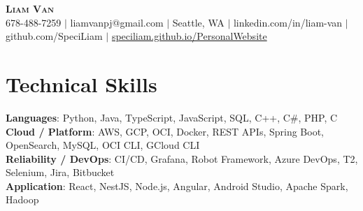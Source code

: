 \documentclass[letterpaper,11pt]{article}
\begin{document}

%
\begin{center}
    \textbf{\Huge \scshape Liam Van} \\ \vspace{1pt}
    \small 678-488-7259 $|$ \small {liamvanpj@gmail.com} $|$ Seattle, WA
 {{$|$ linkedin.com/in/liam-van} {$|$ github.com/SpeciLiam} {$|$ \href{https://speciliam.github.io/PersonalWebsite}{speciliam.github.io/PersonalWebsite}}}

\end{center}

\section{Technical Skills}
 \begin{itemize}[leftmargin=0.15in, label={}]
    \small{\item{
     \textbf{Languages}{: Python, Java, TypeScript, JavaScript, SQL, C++, C\#, PHP, C} \\
     \textbf{Cloud / Platform}{: AWS, GCP, OCI, Docker, REST APIs, Spring Boot, OpenSearch, MySQL, OCI CLI, GCloud CLI} \\
     \textbf{Reliability / DevOps}{: CI/CD, Grafana, Robot Framework, Azure DevOps, T2, Selenium, Jira, Bitbucket} \\
     \textbf{Application}{: React, NestJS, Node.js, Angular, Android Studio, Apache Spark, Hadoop} \\
    }}
 \end{itemize}
%
\end{document}
